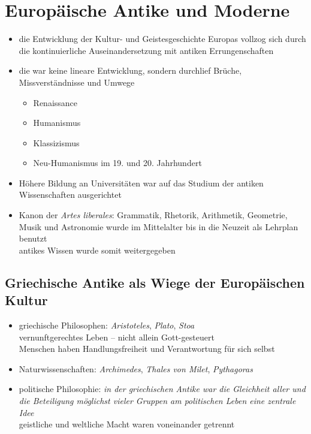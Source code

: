\documentclass[11pt,a4paper]{article}
\begin{document}
\section*{\textsf{Europäische Antike und Moderne}}

\begin{itemize}
\item die Entwicklung der Kultur- und Geistesgeschichte Europas vollzog sich durch die kontinuierliche Auseinandersetzung mit antiken Errungenschaften
\item die war keine lineare Entwicklung, sondern durchlief Brüche, Missverständnisse und Umwege

	\begin{itemize}
	\item Renaissance
	\item Humanismus
	\item Klassizismus
	\item Neu-Humanismus im 19. und 20. Jahrhundert
	\end{itemize}

\item Höhere Bildung an Universitäten war auf das Studium der antiken Wissenschaften ausgerichtet

\item Kanon der \textsl{Artes liberales}: Grammatik, Rhetorik, Arithmetik, Geometrie, Musik und Astronomie wurde im Mittelalter bis in die Neuzeit als Lehrplan benutzt\\
 antikes Wissen wurde somit weitergegeben

\end{itemize}

\subsection*{\textsf{Griechische Antike als Wiege der Europäischen Kultur}}

\begin{itemize}
\item griechische Philosophen: \textsl{Aristoteles}, \textsl{Plato}, \textsl{Stoa}\\
 vernunftgerechtes Leben -- nicht allein Gott-gesteuert\\
 Menschen haben Handlungsfreiheit und Verantwortung für sich selbst
\item Naturwissenschaften: \textsl{Archimedes}, \textsl{Thales von Milet}, \textsl{Pythagoras}
\item politische Philosophie: \textsl{in der griechischen Antike war die Gleichheit aller und die Beteiligung möglichst vieler Gruppen am politischen Leben eine zentrale Idee}\\
 geistliche und weltliche Macht waren voneinander getrennt
\end{itemize}
\end{document}
